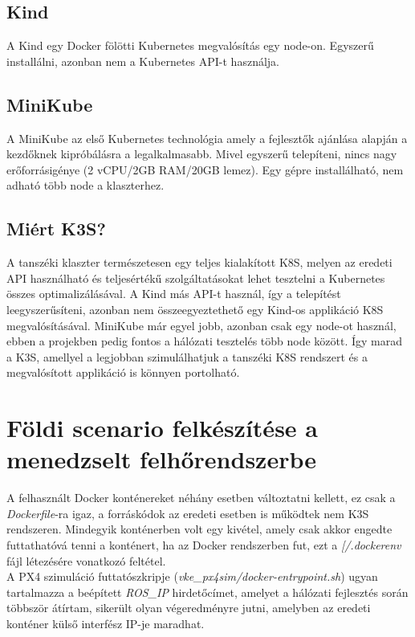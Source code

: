 \subsection{Kind}

A Kind egy Docker fölötti Kubernetes megvalósítás egy node-on. Egyszerű installálni, azonban nem a Kubernetes API-t használja.

\subsection{MiniKube}

A MiniKube az első Kubernetes technológia amely a fejlesztők ajánlása alapján a kezdőknek kipróbálásra a legalkalmasabb. Mivel egyszerű telepíteni, nincs nagy erőforrásigénye (2 vCPU/2GB RAM/20GB lemez). Egy gépre installálható, nem adható több node a klaszterhez. \cite{typesofkubernetes2}

\subsection{Miért K3S?}

A tanszéki klaszter természetesen egy teljes kialakított K8S, melyen az eredeti API használható és teljesértékű szolgáltatásokat lehet tesztelni a Kubernetes összes optimalizálásával. A Kind más API-t használ, így a telepítést leegyszerűsíteni, azonban nem összeegyeztethető egy Kind-os applikáció K8S megvalósításával. MiniKube már egyel jobb, azonban csak egy node-ot használ, ebben a projekben pedig fontos a hálózati tesztelés több node között. Így marad a K3S, amellyel a legjobban szimulálhatjuk a tanszéki K8S rendszert és a megvalósított applikáció is könnyen portolható.

\section{Földi scenario felkészítése a menedzselt felhőrendszerbe}

A felhasznált Docker konténereket néhány esetben változtatni kellett, ez csak a \emph{Dockerfile}-ra igaz, a forráskódok az eredeti esetben is működtek nem K3S rendszeren. Mindegyik konténerben volt egy kivétel, amely csak akkor engedte futtathatóvá tenni a konténert, ha az Docker rendszerben fut, ezt a \emph{[/.dockerenv} fájl létezésére vonatkozó feltétel. \\

\noindent
A PX4 szimuláció futtatószkripje (\emph{vke\_px4sim/docker-entrypoint.sh}) ugyan tartalmazza a beépített \emph{ROS\_IP} hirdetőcímet, amelyet a hálózati fejlesztés során többször átírtam, sikerült olyan végeredményre jutni, amelyben az eredeti konténer külső interfész IP-je maradhat. \\

